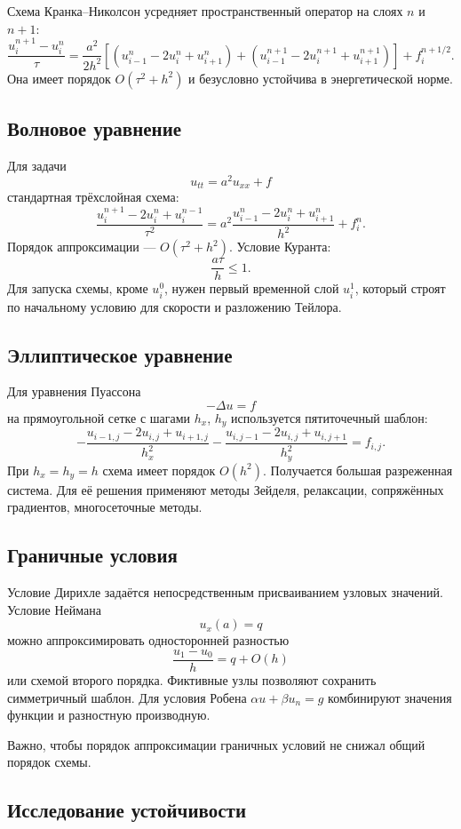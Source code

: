 Схема Кранка--Николсон усредняет пространственный оператор на слоях $n$ и $n+1$:
\[
\frac{u_i^{n+1}-u_i^n}{\tau}
=
\frac{a^2}{2h^2}
\left[
(u_{i-1}^{n}-2u_i^{n}+u_{i+1}^{n})+
(u_{i-1}^{n+1}-2u_i^{n+1}+u_{i+1}^{n+1})
\right]
+f_i^{n+1/2}.
\]
Она имеет порядок $O(\tau^2+h^2)$ и безусловно устойчива в энергетической норме.

\subsection{Волновое уравнение}

Для задачи
\[
    u_{tt}=a^2u_{xx}+f
\]
стандартная трёхслойная схема:
\[
    \frac{u_i^{n+1}-2u_i^n+u_i^{n-1}}{\tau^2}
    =a^2\frac{u_{i-1}^n-2u_i^n+u_{i+1}^n}{h^2}+f_i^n.
\]
Порядок аппроксимации --- $O(\tau^2+h^2)$. Условие Куранта:
\[
    \frac{a\tau}{h}\leq1.
\]
Для запуска схемы, кроме $u_i^0$, нужен первый временной слой $u_i^1$, который
строят по начальному условию для скорости и разложению Тейлора.

\subsection{Эллиптическое уравнение}

Для уравнения Пуассона
\[
    -\Delta u=f
\]
на прямоугольной сетке с шагами $h_x$, $h_y$ используется пятиточечный шаблон:
\[
-\frac{u_{i-1,j}-2u_{i,j}+u_{i+1,j}}{h_x^2}
-\frac{u_{i,j-1}-2u_{i,j}+u_{i,j+1}}{h_y^2}
=f_{i,j}.
\]
При $h_x=h_y=h$ схема имеет порядок $O(h^2)$. Получается большая разреженная
система. Для её решения применяют методы Зейделя, релаксации, сопряжённых
градиентов, многосеточные методы.

\subsection{Граничные условия}

Условие Дирихле задаётся непосредственным присваиванием узловых значений.
Условие Неймана
\[
    u_x(a)=q
\]
можно аппроксимировать односторонней разностью
\[
    \frac{u_1-u_0}{h}=q+O(h)
\]
или схемой второго порядка. Фиктивные узлы позволяют сохранить симметричный
шаблон. Для условия Робена $\alpha u+\beta u_n=g$ комбинируют значения функции
и разностную производную.

Важно, чтобы порядок аппроксимации граничных условий не снижал общий порядок
схемы.

\subsection{Исследование устойчивости}

